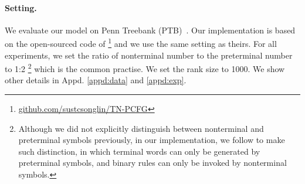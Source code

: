 \documentclass[11pt]{article}
\begin{document}
\paragraph{Setting.} We evaluate our model on Penn Treebank (PTB)~\citep{marcus-etal-1994-penn}. Our implementation is based on the open-sourced code of \citet{yang-etal-2021-pcfgs}\footnote{\url{github.com/sustcsonglin/TN-PCFG}} and we use the same setting as theirs. For all experiments, we set the ratio of nonterminal number to the preterminal number to 1:2 \footnote{Although we did not explicitly distinguish between nonterminal and preterminal symbols previously, in our implementation, we follow \citet{kim-etal-2019-compound} to make such distinction, in which terminal words can only be generated by preterminal symbols, and binary rules can only be invoked by nonterminal symbols.} which is the common practise. We set the rank size to 1000. We show other details in Appd. \ref{appd:data} and \ref{appd:exp}. 



\begin{table}[tb!]
    \centering 
    \caption{Results on PTB. S-F1: sentence-level F1. PTs: preterminals. NTs: nonterminals.}
    \label{tab:ptb}
\end{table}
\end{document}
